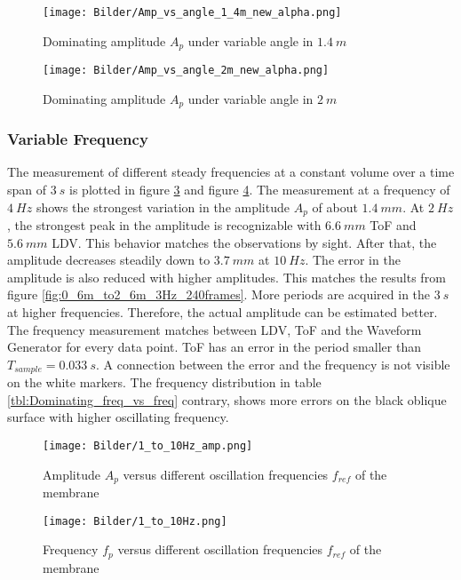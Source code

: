 \begin{figure}[!h]  
	\centering
	\texttt{[image: Bilder/Amp\_vs\_angle\_1\_4m\_new\_alpha.png]}
	\caption{Dominating amplitude $A_p$ under variable angle in $1.4~m$}
	\label{fig:Amplitude_vs_angle_1_4m}
\end{figure}

\begin{figure}[!h]  
	\centering
	\texttt{[image: Bilder/Amp\_vs\_angle\_2m\_new\_alpha.png]}
	\caption{Dominating amplitude $A_p$ under variable angle in $2~m$}
	\label{fig:Amplitude_vs_angle_2m}
\end{figure}

\subsubsection{Variable Frequency}

The measurement of different steady frequencies at a constant volume over a time span of $3~s$ is plotted in figure \ref{fig:1_to_10Hz} and figure \ref{fig:1to10Hz_Frequency_Plot}. The measurement at a frequency of $4~Hz$ shows the strongest variation in the amplitude $A_p$ of about $1.4~mm$. At $2~Hz$, the strongest peak in the amplitude is recognizable with $6.6~mm$ ToF and $5.6~mm$ LDV. This behavior matches the observations by sight. After that, the amplitude decreases steadily down to $3.7~mm$ at $10~Hz$. The error in the amplitude is also reduced with higher amplitudes. This matches the results from figure \ref{fig:0_6m_to2_6m_3Hz_240frames}. More periods are acquired in the $3~s$ at higher frequencies. Therefore, the actual amplitude can be estimated better. The frequency measurement matches between LDV, ToF and the Waveform Generator for every data point. ToF has an error in the period smaller than $T_{sample}=0.033~s$. A connection between the error and the frequency is not visible on the white markers. The frequency distribution in table \ref{tbl:Dominating_freq_vs_freq} contrary, shows more errors on the black oblique surface with higher oscillating frequency.

\begin{figure}[!h] 
	\centering
	\texttt{[image: Bilder/1\_to\_10Hz\_amp.png]}
	\caption{Amplitude $A_p$ versus different oscillation frequencies $f_{ref}$ of the membrane}
	\label{fig:1_to_10Hz}
\end{figure}

\begin{figure}[!h]  
	\centering
	\texttt{[image: Bilder/1\_to\_10Hz.png]}
	\caption{Frequency $f_p$ versus different oscillation frequencies $f_{ref}$ of the membrane}
	\label{fig:1to10Hz_Frequency_Plot}
\end{figure}

